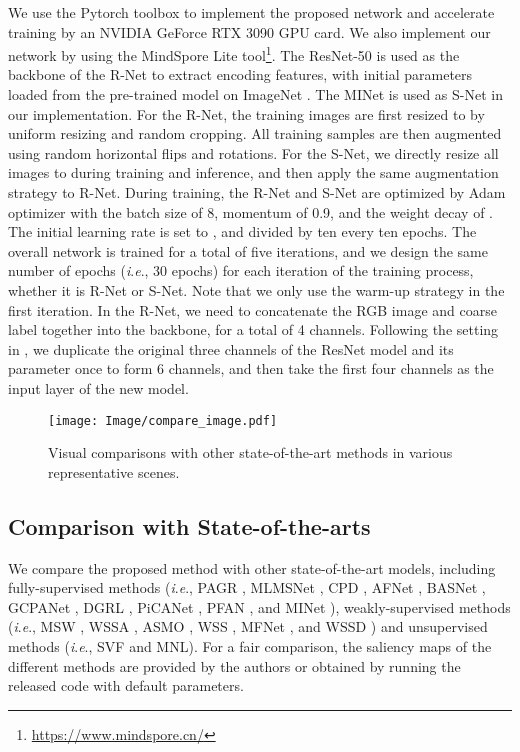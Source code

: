 \documentclass[journal]{IEEEtran}
\newcommand{\ie}{\textit{i}.\textit{e}.}
\begin{document}
We use the Pytorch toolbox to implement the proposed network and accelerate training by an NVIDIA GeForce RTX 3090 GPU card. We also implement our network by using the MindSpore Lite tool\footnote{\url{https://www.mindspore.cn/}}.
The ResNet-50 is used as the backbone of the R-Net to extract encoding features, with initial parameters loaded from the pre-trained model on ImageNet \cite{deng2009imagenet}. The MINet \cite{DBLP:conf/cvpr/PangZZL20} is used as S-Net in our implementation.
For the R-Net, the training images are first resized to  by uniform resizing and random cropping. All training samples are then augmented using random horizontal flips and rotations.
For the S-Net, we directly resize all images to  during training and inference, and then apply the same augmentation strategy to R-Net.
During training, the R-Net and S-Net are optimized by Adam optimizer with the batch size of 8, momentum of 0.9, and the weight decay of . The initial learning rate is set to , and divided by ten every ten epochs.
The overall network is trained for a total of five iterations, and we design the same number of epochs (\ie, 30 epochs) for each iteration of the training process, whether it is R-Net or S-Net.
Note that we only use the warm-up strategy in the first iteration. In the R-Net, we need to concatenate the RGB image and coarse label together into the backbone, for a total of 4 channels. Following the setting in \cite{DBLP:conf/cvpr/FuFJZ20}, we duplicate the original three channels of the ResNet model and its parameter once to form 6 channels, and then take the first four channels as the input layer of the new model.


 \begin{figure*}[!t]
	\centering
	\texttt{[image: Image/compare\_image.pdf]}
	\caption{Visual comparisons with other state-of-the-art methods in various representative scenes.}
	\label{visualization_compare}
\end{figure*}

\subsection{Comparison with State-of-the-arts}
We compare the proposed method with other state-of-the-art models, including fully-supervised methods (\ie, PAGR \cite{zhang2018progressive}, MLMSNet \cite{wu2019mutual}, CPD \cite{wu2019cascaded}, AFNet \cite{feng2019attentive}, BASNet \cite{qin2019basnet}, GCPANet \cite{chen2020global}, DGRL \cite{DBLP:conf/cvpr/WangZWL0RB18}, PiCANet \cite{DBLP:journals/tip/LiuHY20}, PFAN \cite{DBLP:conf/cvpr/ZhaoW19}, and MINet \cite{DBLP:conf/cvpr/PangZZL20}), weakly-supervised methods (\ie, MSW \cite{zeng2019multi}, WSSA \cite{zhang2020weakly}, ASMO \cite{li2018weakly},  WSS \cite{wang2017learning}, MFNet \cite{DBLP:conf/iccv/PiaoWZL21}, and WSSD \cite{DBLP:journals/tcsv/ZhengTZML21}) and unsupervised methods (\ie, SVF \cite{zhang2017supervision} and MNL\cite{zhang2018deep}). For a fair comparison, the saliency maps of the different methods are provided by the authors or obtained by running the released code with default parameters.
\end{document}
